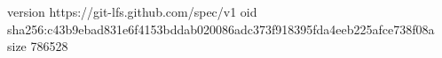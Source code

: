 version https://git-lfs.github.com/spec/v1
oid sha256:c43b9ebad831e6f4153bddab020086adc373f918395fda4eeb225afce738f08a
size 786528

